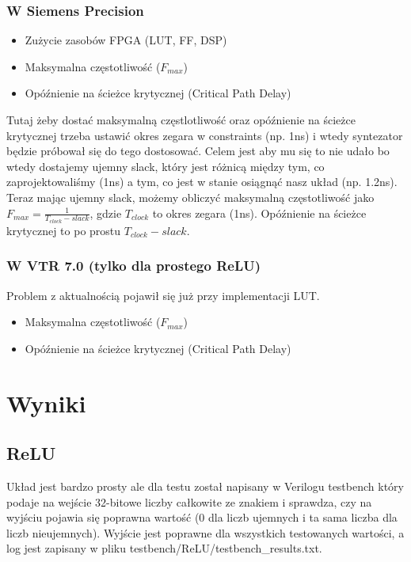 \documentclass[12pt, a4paper, oneside]{scrreprt}
\begin{document}
\subsection{W Siemens Precision}
\begin{itemize}
    \item Zużycie zasobów FPGA (LUT, FF, DSP)
    \item Maksymalna częstotliwość ($F_{max}$)
    \item Opóźnienie na ścieżce krytycznej (Critical Path Delay)
\end{itemize}
Tutaj żeby dostać maksymalną częstlotliwość oraz opóźnienie na ścieżce krytycznej
trzeba ustawić okres zegara w constraints (np. 1ns) i wtedy syntezator będzie próbował się do tego dostosować.
Celem jest aby mu się to nie udało bo wtedy dostajemy ujemny slack,
który jest różnicą między tym, co zaprojektowaliśmy (1ns) a tym, co jest w stanie osiągnąć nasz układ (np. 1.2ns).
Teraz mając ujemny slack, możemy obliczyć maksymalną częstotliwość jako
$F_{max} = \frac{1}{T_{clock} - slack}$, gdzie $T_{clock}$ to okres zegara (1ns).
Opóźnienie na ścieżce krytycznej to po prostu $T_{clock} - slack$.

\subsection{W VTR 7.0 (tylko dla prostego ReLU)}
Problem z aktualnością pojawił się już przy implementacji LUT.
\begin{itemize}
    \item Maksymalna częstotliwość ($F_{max}$)
    \item Opóźnienie na ścieżce krytycznej (Critical Path Delay)
\end{itemize}

\chapter{Wyniki}

\section{ReLU}

Układ jest bardzo prosty ale dla testu został napisany w Verilogu testbench który podaje
na wejście 32-bitowe liczby całkowite ze znakiem i sprawdza, czy na wyjściu pojawia
się poprawna wartość (0 dla liczb ujemnych i ta sama liczba dla liczb nieujemnych).
Wyjście jest poprawne dla wszystkich testowanych wartości, a log jest zapisany w
pliku testbench/ReLU/testbench\_results.txt.
\end{document}
